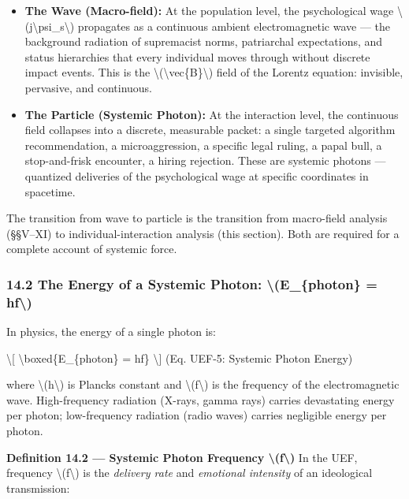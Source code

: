 {\begin{itemize}
\tightlist
\item
  \textbf{The Wave (Macro-field):} At the population level, the
  psychological wage
  \textbackslash(j\textbackslash psi\_s\textbackslash) propagates as a
  continuous ambient electromagnetic wave --- the background radiation
  of supremacist norms, patriarchal expectations, and status hierarchies
  that every individual moves through without discrete impact events.
  This is the \textbackslash(\textbackslash vec\{B\}\textbackslash)
  field of the Lorentz equation: invisible, pervasive, and continuous.
\item
  \textbf{The Particle (Systemic Photon):} At the interaction level, the
  continuous field collapses into a discrete, measurable packet: a
  single targeted algorithm recommendation, a microaggression, a
  specific legal ruling, a papal bull, a stop-and-frisk encounter, a
  hiring rejection. These are systemic photons --- quantized deliveries
  of the psychological wage at specific coordinates in spacetime.
\end{itemize}

The transition from wave to particle is the transition from macro-field
analysis (§§V--XI) to individual-interaction analysis (this section).
Both are required for a complete account of systemic force.

\subsubsection{14.2 The Energy of a Systemic Photon:
\textbackslash(E\_\{photon\} =
hf\textbackslash)}\label{the-energy-of-a-systemic-photon-e_photon-hf}

In physics, the energy of a single photon is:

\textbackslash{[} \textbackslash boxed\{E\_\{photon\} = hf\}
\textbackslash{]} {(Eq. UEF-5: Systemic Photon Energy)}

where \textbackslash(h\textbackslash) is Planck\textquotesingle s
constant and \textbackslash(f\textbackslash) is the frequency of the
electromagnetic wave. High-frequency radiation (X-rays, gamma rays)
carries devastating energy per photon; low-frequency radiation (radio
waves) carries negligible energy per photon.

\textbf{Definition 14.2 --- Systemic Photon Frequency
\textbackslash(f\textbackslash)} In the UEF, frequency
\textbackslash(f\textbackslash) is the \emph{delivery rate} and
\emph{emotional intensity} of an ideological transmission:

}
